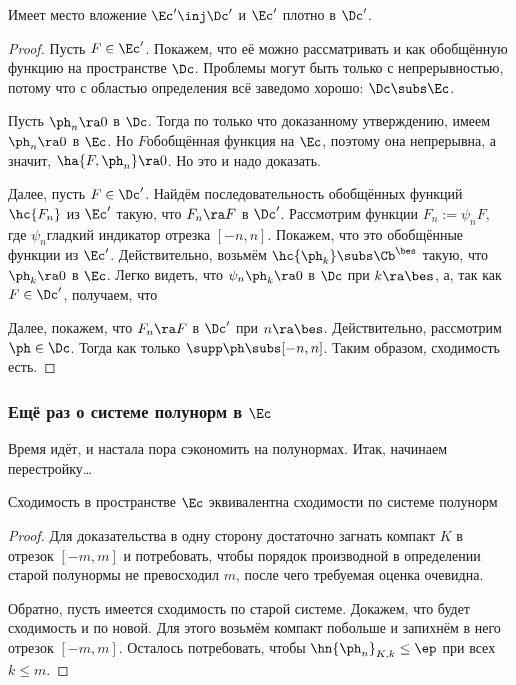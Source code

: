 \documentclass[a4paper]{article}
\begin{document}
\begin{stm}
Имеет место вложение $\Ec' \inj \Dc'$ и $\Ec'$ плотно в $\Dc'$.
\end{stm}
\begin{proof}
Пусть $F \in \Ec'$. Покажем, что её можно рассматривать и как обобщённую функцию
на пространстве $\Dc$. Проблемы могут быть только с непрерывностью, потому что
с областью определения всё заведомо хорошо: $\Dc \subs \Ec$.

Пусть $\ph_n \ra 0$ в $\Dc$. Тогда по только что доказанному утверждению,
имеем $\ph_n\ra 0$ в $\Ec$. Но $F$\т обобщённая функция на $\Ec$, поэтому она
непрерывна, а значит, $\ha{F,\ph_n} \ra 0$. Но это и надо доказать.

Далее, пусть $F \in \Dc'$. Найдём последовательность обобщённых функций $\hc{F_n}$ из $\Ec'$
такую, что $F_n \ra F$ в $\Dc'$. Рассмотрим функции $F_n := \psi_n F$,
где $\psi_n$\т гладкий индикатор отрезка $[-n,n]$. Покажем, что это обобщённые функции из $\Ec'$.
Действительно, возьмём $\hc{\ph_k} \subs \Cb^\bes$ такую, что $\ph_k \ra 0$ в $\Ec$.
Легко видеть, что $\psi_n\ph_k \ra 0$ в $\Dc$ при $k \ra \bes$, а, так как $F \in \Dc'$, получаем, что

Далее, покажем, что $F_n \ra F$ в $\Dc'$ при $n \ra \bes$.
Действительно, рассмотрим $\ph \in \Dc$. Тогда
как только $\supp \ph \subs [-n,n]$. Таким образом, сходимость есть.
\end{proof}


\subsubsection{Ещё раз о системе полунорм в $\Ec$}

Время идёт, и настала пора сэкономить на полунормах. Итак, начинаем перестройку\dots

\begin{lemma}
Сходимость в пространстве $\Ec$ эквивалентна сходимости по системе полунорм
\end{lemma}
\begin{proof}
Для доказательства в одну сторону достаточно загнать компакт $K$ в отрезок $[-m,m]$
и потребовать, чтобы порядок производной в определении старой полунормы не превосходил $m$,
после чего требуемая оценка очевидна.

Обратно, пусть имеется сходимость по старой системе. Докажем, что будет сходимость и по новой.
Для этого возьмём компакт побольше и запихнём в него отрезок $[-m,m]$. Осталось потребовать,
чтобы $\hn{\ph_n}_{K,k} \le \ep$ при всех $k \le m$.
\end{proof}
\end{document}
